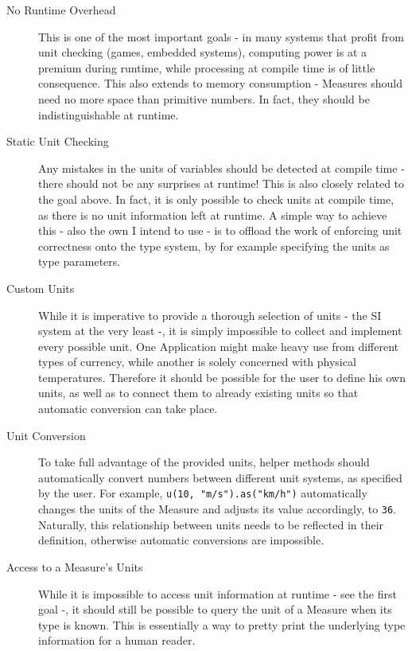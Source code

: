 \documentclass[12pt,oneside,a4paper]{scrbook}
\theoremstyle{definition}
\begin{document}
\begin{description}
  \item[No Runtime Overhead] This is one of the most important goals - in many systems that profit from unit checking (games, embedded systems), computing power is at a premium during runtime, while processing at compile time is of little consequence. This also extends to memory consumption - Measures should need no more space than primitive numbers. In fact, they should be indistinguishable at runtime.

  \item[Static Unit Checking] Any mistakes in the units of variables should be detected at compile time - there should not be any surprises at runtime! This is also closely related to the goal above. In fact, it is only possible to check units at compile time, as there is no unit information left at runtime. A simple way to achieve this - also the own I intend to use - is to offload the work of enforcing unit correctness onto the type system, by for example specifying the units as type parameters.

  \item[Custom Units] While it is imperative to provide a thorough selection of units - the SI system at the very least -, it is simply impossible to collect and implement every possible unit. One Application might make heavy use from different types of currency, while another is solely concerned with physical temperatures. Therefore it should be possible for the user to define his own units, as well as to connect them to already existing units so that automatic conversion can take place.

  \item[Unit Conversion] To take full advantage of the provided units, helper methods should automatically convert numbers between different unit systems, as specified by the user. For example, \verb|u(10, "m/s").as("km/h")| automatically changes the units of the Measure and adjusts its value accordingly, to \verb/36/. Naturally, this relationship between units needs to be reflected in their definition, otherwise automatic conversions are impossible.

  \item[Access to a Measure's Units] While it is impossible to access unit information at runtime - see the first goal -, it should still be possible to query the unit of a Measure when its type is known. This is essentially a way to pretty print the underlying type information for a human reader.


\end{description}
\end{document}
